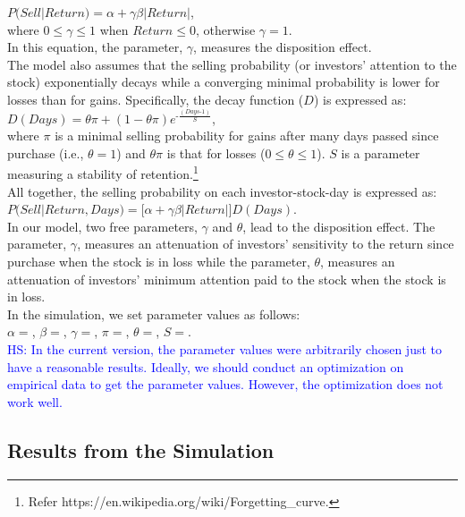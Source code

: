 \documentclass[11pt, a4paper]{article}
\newcommand{\HS}[1]{\textcolor{blue}{HS: #1}}
\begin{document}
\noindent
$P(Sell|Return)=\alpha+\gamma \beta  |Return|$, \\
where $0\leq \gamma \leq 1$ when $Return\leq 0$, otherwise $\gamma=1$. \\
In this equation, the parameter, $\gamma$, measures the disposition effect.\\

The model also assumes that the selling probability (or investors' attention to the stock) exponentially decays while a converging minimal probability is lower for losses than for gains. Specifically, the decay function ($D$) is expressed as:\\

\noindent
$D(Days)=\theta \pi + (1-\theta \pi) e^{\mbox{-}\frac{(Days\mbox{-}1)}{S}}$,\\
where $\pi$ is a minimal selling probability for gains after many days passed since purchase (i.e., $\theta=1$) and $\theta \pi$ is that for losses ($0\leq \theta \leq 1$). $S$ is a parameter measuring a stability of retention.\footnote{Refer https://en.wikipedia.org/wiki/Forgetting\_curve.}\\

All together, the selling probability on each investor-stock-day is expressed as:\\

\noindent
$P(Sell|Return, Days)=\bigg[\alpha+\gamma \beta |Return|\bigg]D(Days)$.\\

In our model, two free parameters, $\gamma$ and $\theta$, lead to the disposition effect. The parameter, $\gamma$,  measures an attenuation of investors' sensitivity to the return since purchase when the stock is in loss while the parameter, $\theta$, measures an attenuation of investors' minimum attention paid to the stock when the stock is in loss. \\

In the simulation, we set parameter values as follows:\\
$\alpha=$, $\beta=$, $\gamma=$, $\pi=$, $\theta=$, $S=$. \\
\HS{In the current version, the parameter values were arbitrarily chosen just to have a reasonable results. Ideally, we should conduct an optimization on empirical data to get the parameter values. However, the optimization does not work well.}




\subsection{Results from the Simulation}
\end{document}
